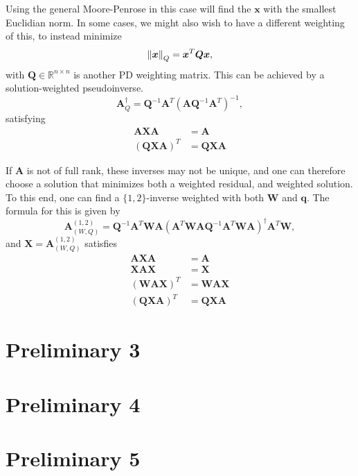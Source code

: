 \documentclass[../main.tex]{subfiles}
\begin{document}
Using the general Moore-Penrose in this case will find the $\bm{x}$ with the smallest Euclidian norm. In some cases, we might also wish to have a different weighting of this, to instead minimize
\begin{equation}
    \left\lVert\bm{x}\right\rVert_Q = \bm{x}^T \bm{Q} \bm{x},
\end{equation}
with $\bm{Q} \in \mathbb{R}^{n \times n}$ is another PD weighting matrix. This can be achieved by a solution-weighted pseudoinverse.
\begin{equation}
    \bm{A}^{\dagger}_Q = \bm{Q}^{-1} \bm{A}^T (\bm{A} \bm{Q}^{-1} \bm{A}^T)^{-1},
\end{equation}
satisfying
\begin{subequations}
    \begin{align}
        \bm{A}\bm{X}\bm{A} &= \bm{A} \\
        (\bm{Q}\bm{X}\bm{A})^T &= \bm{Q} \bm{X} \bm{A}
    \end{align}
\end{subequations}

If $\bm{A}$ is not of full rank, these inverses may not be unique, and one can therefore choose a solution that minimizes both a weighted residual, and weighted solution. To this end, one can find a $\{1, 2\}$-inverse weighted with both $\bm{W}$ and $\bm{q}$. The formula for this is given by
\begin{equation}
    \bm{A}^{(1, 2)}_{(W, Q)}
    = \bm{Q}^{-1} \bm{A}^T \bm{W} \bm{A}
    (\bm{A}^T \bm{W} \bm{A} \bm{Q}^{-1} \bm{A}^T \bm{W} \bm{A})^{\dagger}
    \bm{A}^T \bm{W},
\end{equation}
and $\bm{X} = \bm{A}^{(1, 2)}_{(W, Q)}$ satisfies
\begin{subequations}
    \begin{align}
        \bm{AXA} &= \bm{A} \\
        \bm{XAX} &= \bm{X} \\
        (\bm{W}\bm{A}\bm{X})^T &= \bm{W}\bm{A}\bm{X} \\
        (\bm{Q}\bm{X}\bm{A})^T &= \bm{Q} \bm{X} \bm{A}
    \end{align}
\end{subequations}
\section{Preliminary 3}
\section{Preliminary 4}
\section{Preliminary 5}
\end{document}
